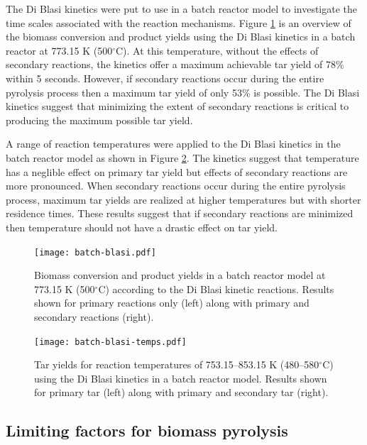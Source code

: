 The Di Blasi kinetics were put to use in a batch reactor model to investigate the time scales associated with the reaction mechanisms. Figure \ref{fig:batch-blasi} is an overview of the biomass conversion and product yields using the Di Blasi kinetics in a batch reactor at 773.15 K (500$^\circ$C). At this temperature, without the effects of secondary reactions, the kinetics offer a maximum achievable tar yield of 78\% within 5 seconds. However, if secondary reactions occur during the entire pyrolysis process then a maximum tar yield of only 53\% is possible. The Di Blasi kinetics suggest that minimizing the extent of secondary reactions is critical to producing the maximum possible tar yield.

A range of reaction temperatures were applied to the Di Blasi kinetics in the batch reactor model as shown in Figure \ref{fig:batch-blasi-temps}. The kinetics suggest that temperature has a neglible effect on primary tar yield but effects of secondary reactions are more pronounced. When secondary reactions occur during the entire pyrolysis process, maximum tar yields are realized at higher temperatures but with shorter residence times. These results suggest that if secondary reactions are minimized then temperature should not have a drastic effect on tar yield.

\begin{figure}[H]
    \centering
    \texttt{[image: batch-blasi.pdf]}
    \caption{Biomass conversion and product yields in a batch reactor model at 773.15 K (500$^\circ$C) according to the Di Blasi kinetic reactions. Results shown for primary reactions only (left) along with primary and secondary reactions (right).}
    \label{fig:batch-blasi}
\end{figure}

\begin{figure}[H]
    \centering
    \texttt{[image: batch-blasi-temps.pdf]}
    \caption{Tar yields for reaction temperatures of 753.15--853.15 K (480--580$^\circ$C) using the Di Blasi kinetics in a batch reactor model. Results shown for primary tar (left) along with primary and secondary tar (right).}
    \label{fig:batch-blasi-temps}
\end{figure}


\subsection{Limiting factors for biomass pyrolysis}

